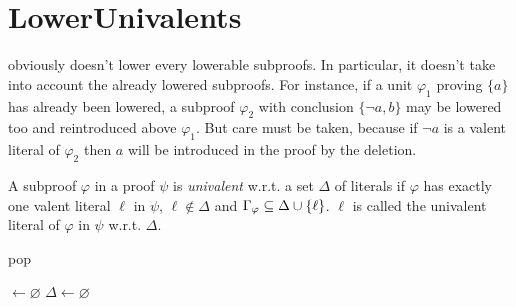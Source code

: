\documentclass{llncs}
\begin{document}
\section{LowerUnivalents} \label{sec:LUniv}

{\LowerUnits} obviously doesn't lower every lowerable subproofs. In particular, it doesn't take into
account the already lowered subproofs. For instance, if a unit $\varphi_1$ proving $\{a\}$ has
already been lowered, a subproof $\varphi_2$ with conclusion $\{\neg a,b\}$ may be lowered too and
reintroduced above $\varphi_1$. But care must be taken, because if $\neg a$ is a valent literal of
$\varphi_2$ then $a$ will be introduced in the proof by the deletion.

\begin{definition}
A subproof $\varphi$ in a proof $\psi$ is \emph{univalent} w.r.t. a set $\Delta$ of literals if
$\varphi$ has exactly one valent literal $\ell$ in $\psi$, $\ell \notin \Delta$ and
$\Gamma_{\varphi} \subseteq \Delta \cup \left\{ \ell \right\}$. $\ell$ is called the univalent
literal of $\varphi$ in $\psi$ w.r.t.  $\Delta$.
\end{definition}

\begin{algorithm}[bt]
  \BlankLine

   {pop}

  \Univ $\leftarrow \varnothing$ \;
  $\Delta \leftarrow \varnothing$ \;
  \BlankLine

  \BlankLine


  \caption{\LowerUnivalents}
  \label{algo:LUniv}
\end{algorithm}
\end{document}
